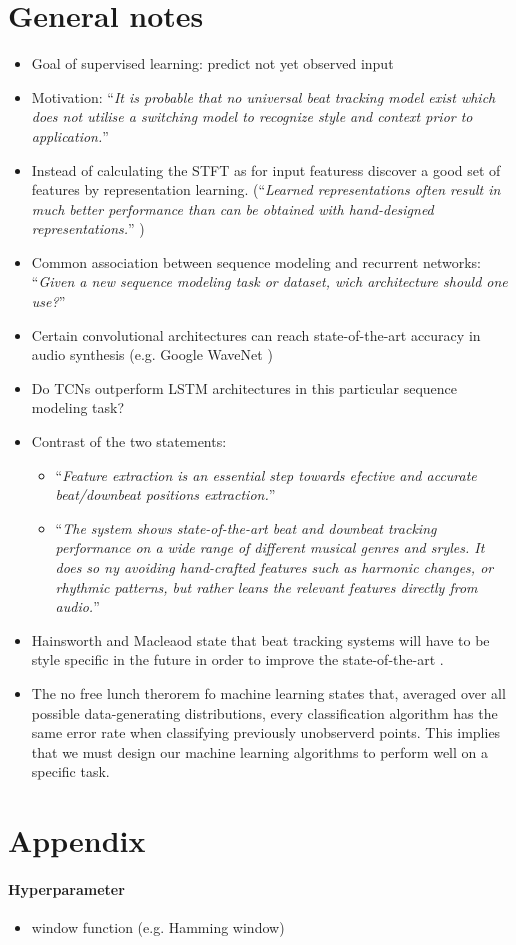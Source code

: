\documentclass{scrartcl}
\begin{document}
\section*{General notes}
\begin{itemize}
\item Goal of supervised learning: predict not yet observed input
\item Motivation: ``\emph{It is probable that no universal beat tracking model exist which does not utilise a switching model to recognize style and context prior to application.}'' \cite[Collins2006]{Collins2006}
\item Instead of calculating the STFT as for input featuress discover a good set of features by representation learning. (``\emph{Learned representations often result in much better performance than can be obtained with hand-designed representations.}'' \cite[Goodfellow2016]{Goodfellow2016})
\item Common association between sequence modeling and recurrent networks: ``\emph{Given a new sequence modeling task or dataset, wich architecture should one use?}'' \cite[Bai2018]{Bai2018}
\item Certain convolutional architectures can reach state-of-the-art accuracy in audio synthesis (e.g. Google WaveNet \cite[Oord2016]{Oord2016})
\item Do TCNs outperform LSTM architectures in this particular sequence modeling task?
\item Contrast of the two statements:
\begin{itemize}
\item ``\emph{Feature extraction is an essential step towards efective and accurate beat/downbeat positions extraction.}'' \cite[Khadkevich2012]{Khadkevich2012}
\item ``\emph{The system shows state-of-the-art beat and downbeat tracking performance on a wide range of different musical genres and sryles. It does so ny avoiding hand-crafted features such as harmonic changes, or rhythmic patterns, but rather leans the relevant features directly from audio.}'' \cite[Boeck2016b]{Boeck2016b}
\end{itemize} 
\item Hainsworth and Macleaod state that beat tracking systems will have to be style specific in the future in order to improve the state-of-the-art \cite{Hainsworth2004}.
\item The no free lunch therorem fo machine learning \cite{Wolpert1996} states that, averaged over all possible data-generating distributions, every classification algorithm has the same error rate when classifying previously unobserverd points. This implies that we must design our machine learning algorithms to perform well on a specific task.
\end{itemize}

\section*{Appendix}

\paragraph{Hyperparameter} 
\begin{itemize}
\item window function (e.g. Hamming window)
\end{itemize}

\newpage 


\end{document}
